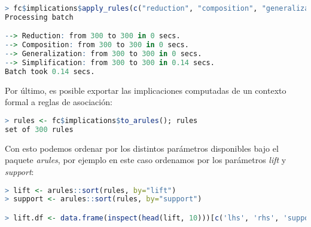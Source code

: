 \documentclass[../../main.tex]{subfiles}
\begin{document}
\begin{lstlisting}[language=R]
> fc$implications$apply_rules(c("reduction", "composition", "generalization", "simplification"))
Processing batch

--> Reduction: from 300 to 300 in 0 secs.
--> Composition: from 300 to 300 in 0 secs.
--> Generalization: from 300 to 300 in 0 secs.
--> Simplification: from 300 to 300 in 0.14 secs.
Batch took 0.14 secs. 
\end{lstlisting}

\vskip 0.2in

Por último, es posible exportar las implicaciones computadas de un contexto formal a reglas de asociación:

\begin{lstlisting}[language=R]
> rules <- fc$implications$to_arules(); rules
set of 300 rules 
\end{lstlisting}

\vskip 0.2in

Con esto podemos ordenar por los distintos parámetros disponibles bajo el paquete \textit{arules}, por ejemplo en este caso ordenamos por los parámetros \textit{lift} y \textit{support}:

\begin{lstlisting}[language=R]
> lift <- arules::sort(rules, by="lift")
> support <- arules::sort(rules, by="support")

> lift.df <- data.frame(inspect(head(lift, 10)))[c('lhs', 'rhs', 'support', 'confidence', 'lift')]; lift.df
\end{lstlisting}

\vskip 0.2in
\end{document}
